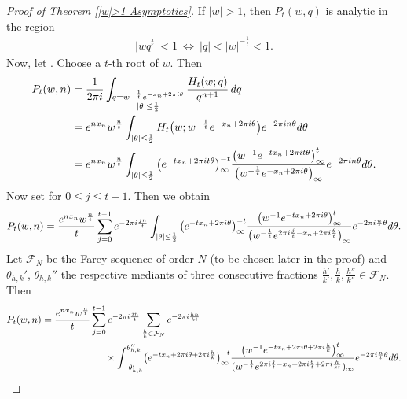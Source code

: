\documentclass[11pt]{article}
\numberwithin{equation}{section}
\begin{document}
\begin{proof}[Proof of Theorem \ref{|w|>1 Asymptotics}] If $|w|>1$, then $P_t(w,q)$ is analytic in the region
 \begin{align*}
 \bigl|wq^t\bigr|<1 \ \iff\  |q|< |w|^{-\frac{1}{t}}<1.
 \end{align*}
 Now, let . Choose a $t$-th root of $w$. Then
 \begin{align*}
 P_t(w,n)&{}=\frac{1}{2\pi {\rm i}} \int_{\substack{q=w^{-\frac{1}{t}}{\rm e}^{-x_n+2\pi {\rm i} \theta} \\ |\theta|\leq \frac{1}{2}}} \frac{H_t(w;q)}{q^{n+1}} \,{\rm d}q \\
 &{}={\rm e}^{nx_n}w^{\frac{n}{t}}\int_{|\theta|\leq \frac{1}{2}} H_t\big(w;w^{-\frac{1}{t}}{\rm e}^{-x_n+2\pi {\rm i} \theta}\big){\rm e}^{-2\pi {\rm i} n \theta} {\rm d}\theta \\
 &{}={\rm e}^{nx_n}w^{\frac{n}{t}}\int_{|\theta|\leq \frac{1}{2}} \big({\rm e}^{-tx_n+2\pi {\rm i} t \theta}\big)_{\infty}^{-t}\frac{\big(w^{-1}{\rm e}^{-tx_n+2\pi {\rm i} t \theta}\big)_{\infty}^t}{\big(w^{-\frac{1}{t}}{\rm e}^{-x_n+2\pi {\rm i} \theta}\big)_{\infty}}{\rm e}^{-2\pi {\rm i} n \theta} {\rm d}\theta.
 \end{align*}
 Now set  for $0\leq j \leq t-1$. Then we obtain
 \begin{align*}
 P_t(w,n)
 =\frac{{\rm e}^{nx_n}w^{\frac{n}{t}}}{t}\sum_{j=0}^{ t-1}{\rm e}^{-2\pi {\rm i} \frac{jn}{t}}\int_{|\theta|\leq \frac{1}{2}} \big({\rm e}^{-tx_n+2\pi {\rm i} \theta}\big)_{\infty}^{-t}\frac{\big(w^{-1}{\rm e}^{-tx_n+2\pi {\rm i} \theta}\big)_{\infty}^t}{\big(w^{-\frac{1}{t}}{\rm e}^{2\pi {\rm i} \frac{j}{t}-x_n+2\pi {\rm i} \frac{\theta}{t}}\big)_{\infty}}{\rm e}^{-2\pi {\rm i} \frac{n}{t} \theta} {\rm d}\theta.
 \end{align*}
 Let $\mathcal{F}_N$ be the Farey sequence of order $N$ (to be chosen later in the proof) and $\theta_{h,k}'$, $\theta_{h,k}''$ the respective mediants of three consecutive fractions $\frac{h'}{k'},\frac{h}{k},\frac{h''}{k''} \in \mathcal{F}_N$. Then
 \begin{align*}
 P_t(w,n)
 &{}=\frac{{\rm e}^{nx_n}w^{\frac{n}{t}}}{t}\sum_{j=0}^{ t-1}{\rm e}^{-2\pi {\rm i} \frac{jn}{t}} \sum_{\frac{h}{k} \in \mathcal{F}_N} {\rm e}^{-2\pi {\rm i} \frac{hn}{kt}} \\
 &\hphantom{=\frac{{\rm e}^{nx_n}w^{\frac{n}{t}}}{t}\sum_{j=0}^{ t-1}}\,{} \times \int_{-\theta_{h,k}'}^{\theta_{h,k}''} \!\big({\rm e}^{-tx_n+2\pi {\rm i} \theta+2\pi {\rm i} \frac{h}{k}}\big)_{\infty}^{-t}\frac{\big(w^{-1}{\rm e}^{-tx_n+2\pi {\rm i} \theta+2\pi {\rm i} \frac{h}{k}}\big)_{\infty}^t}{(w^{-\frac{1}{t}}{\rm e}^{2\pi {\rm i} \frac{j}{t}-x_n+2\pi {\rm i} \frac{\theta}{t}+2\pi {\rm i} \frac{h}{kt}})_{\infty}}{\rm e}^{-2\pi {\rm i} \frac{n}{t} \theta} {\rm d}\theta.

\end{align*}
\end{proof}
\end{document}
